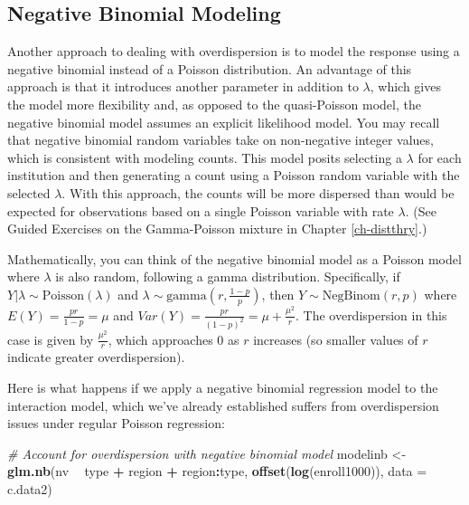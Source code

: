 \documentclass[
]{krantz}
\newenvironment{Shaded}{\begin{snugshade}}{\end{snugshade}}
\newcommand{\CommentTok}[1]{\textcolor[rgb]{0.37,0.37,0.37}{\textit{#1}}}
\newcommand{\DataTypeTok}[1]{\textcolor[rgb]{0.27,0.27,0.27}{#1}}
\newcommand{\KeywordTok}[1]{\textcolor[rgb]{0.27,0.27,0.27}{\textbf{#1}}}
\newcommand{\NormalTok}[1]{#1}
\newcommand{\OperatorTok}[1]{\textcolor[rgb]{0.43,0.43,0.43}{\textbf{#1}}}
\newcommand{\StringTok}[1]{\textcolor[rgb]{0.5,0.5,0.5}{#1}}
\begin{document}
\hypertarget{negative-binomial-modeling}{%
\subsection{Negative Binomial Modeling}\label{negative-binomial-modeling}}

Another approach to dealing with overdispersion is to model the response using a negative binomial instead of a Poisson distribution. An advantage of this approach is that it introduces another parameter in addition to \(\lambda\), which gives the model more flexibility and, as opposed to the quasi-Poisson model, the negative binomial model assumes an explicit likelihood model. You may recall that negative binomial random variables take on non-negative integer values, which is consistent with modeling counts. This model posits selecting a \(\lambda\) for each institution and then generating a count using a Poisson random variable with the selected \(\lambda\). With this approach, the counts will be more dispersed than would be expected for observations based on a single Poisson variable with rate \(\lambda\). (See Guided Exercises on the Gamma-Poisson mixture in Chapter \ref{ch-distthry}.)

Mathematically, you can think of the negative binomial model as a Poisson model where \(\lambda\) is also random, following a gamma distribution. Specifically, if \(Y|\lambda \sim \textrm{Poisson}(\lambda)\) and \(\lambda \sim \textrm{gamma}(r,\frac{1-p}{p})\), then \(Y \sim \textrm{NegBinom}(r,p)\) where \(E(Y)=\frac{pr}{1-p}=\mu\) and \(Var(Y)=\frac{pr}{(1-p)^2}=\mu+\frac{\mu^2}{r}\). The overdispersion in this case is given by \(\frac{\mu^2}{r}\), which approaches 0 as \(r\) increases (so smaller values of \(r\) indicate greater overdispersion).

Here is what happens if we apply a negative binomial regression model  to the interaction model, which we've already established suffers from overdispersion issues under regular Poisson regression:

\begin{Shaded}
\begin{Highlighting}[]
\CommentTok{# Account for overdispersion with negative binomial model}
\NormalTok{modelinb <-}\StringTok{ }\KeywordTok{glm.nb}\NormalTok{(nv }\OperatorTok{~}\StringTok{ }\NormalTok{type }\OperatorTok{+}\StringTok{ }\NormalTok{region }\OperatorTok{+}\StringTok{ }\NormalTok{region}\OperatorTok{:}\NormalTok{type, }
               \KeywordTok{offset}\NormalTok{(}\KeywordTok{log}\NormalTok{(enroll1000)), }\DataTypeTok{data =}\NormalTok{ c.data2)}
\end{Highlighting}
\end{Shaded}
\end{document}
